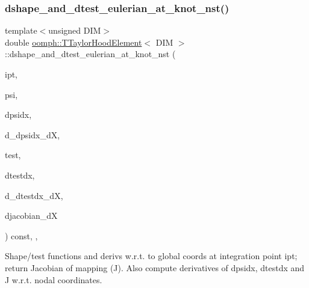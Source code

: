 \mbox{\label{classoomph_1_1TTaylorHoodElement_a4380043c9e57717edcd47202a1b87571}} 
\subsubsection{\texorpdfstring{dshape\+\_\+and\+\_\+dtest\+\_\+eulerian\+\_\+at\+\_\+knot\+\_\+nst()}{dshape\_and\_dtest\_eulerian\_at\_knot\_nst()}\hspace{0.1cm}{\footnotesize\ttfamily [2/4]}}
{\footnotesize\ttfamily template$<$unsigned D\+IM$>$ \\
double \hyperlink{classoomph_1_1TTaylorHoodElement}{oomph\+::\+T\+Taylor\+Hood\+Element}$<$ D\+IM $>$\+::dshape\+\_\+and\+\_\+dtest\+\_\+eulerian\+\_\+at\+\_\+knot\+\_\+nst (\begin{DoxyParamCaption}\item[{const unsigned \&}]{ipt,  }\item[{\hyperlink{classoomph_1_1Shape}{Shape} \&}]{psi,  }\item[{\hyperlink{classoomph_1_1DShape}{D\+Shape} \&}]{dpsidx,  }\item[{\hyperlink{classoomph_1_1RankFourTensor}{Rank\+Four\+Tensor}$<$ double $>$ \&}]{d\+\_\+dpsidx\+\_\+dX,  }\item[{\hyperlink{classoomph_1_1Shape}{Shape} \&}]{test,  }\item[{\hyperlink{classoomph_1_1DShape}{D\+Shape} \&}]{dtestdx,  }\item[{\hyperlink{classoomph_1_1RankFourTensor}{Rank\+Four\+Tensor}$<$ double $>$ \&}]{d\+\_\+dtestdx\+\_\+dX,  }\item[{\hyperlink{classoomph_1_1DenseMatrix}{Dense\+Matrix}$<$ double $>$ \&}]{djacobian\+\_\+dX }\end{DoxyParamCaption}) const\hspace{0.3cm}{\ttfamily [inline]}, {\ttfamily [protected]}, {\ttfamily [virtual]}}



Shape/test functions and derivs w.\+r.\+t. to global coords at integration point ipt; return Jacobian of mapping (J). Also compute derivatives of dpsidx, dtestdx and J w.\+r.\+t. nodal coordinates. 



